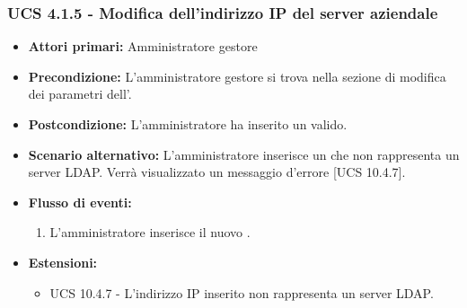 \subsubsection{UCS 4.1.5 - Modifica dell'indirizzo IP del server aziendale}
\begin{itemize}
	\item \textbf{Attori primari:} Amministratore gestore
	\item \textbf{Precondizione:} L'amministratore gestore si trova nella sezione di modifica dei parametri dell'.
	\item \textbf{Postcondizione:} L'amministratore ha inserito un  valido.
	\item \textbf{Scenario alternativo:} L'amministratore inserisce un  che non rappresenta un server LDAP. Verrà visualizzato un messaggio d'errore [UCS 10.4.7].
	\item \textbf{Flusso di eventi:}
	\begin{enumerate}
		\item L'amministratore inserisce il nuovo .
	\end{enumerate}
	\item \textbf{Estensioni:}
	\begin{itemize}
		\item UCS 10.4.7 - L'indirizzo IP inserito non rappresenta un server LDAP.
	\end{itemize}
\end{itemize}



